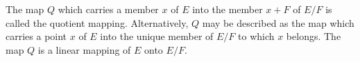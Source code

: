 The map $Q$ which carries a member $x$ of $E$ into the member $x + F$ of $E/F$ is called the quotient mapping. Alternatively, $Q$ may be described as the map which carries a point $x$ of $E$ into the unique member of $E/F$ to which $x$ belongs. The map $Q$ is a linear mapping of $E$ onto $E/F$.
